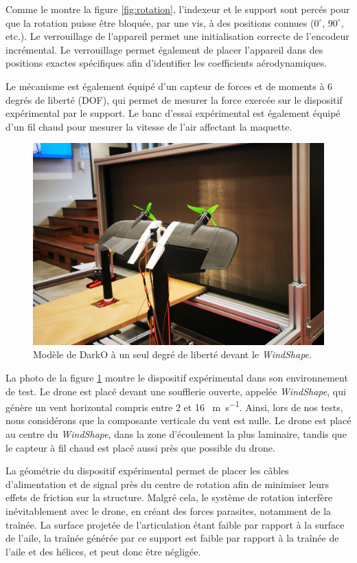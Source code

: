 Comme le montre la figure \ref{fig:rotation}, l'indexeur et le support sont percés pour que la rotation puisse être bloquée, par une vis, à des positions connues ($0^\circ$, $90^\circ$, etc.). Le verrouillage de l'appareil permet une initialisation correcte de l'encodeur incrémental. Le verrouillage permet également de placer l'appareil dans des positions exactes spécifiques afin d'identifier les coefficients aérodynamiques. 

Le mécanisme est également équipé d'un capteur de forces et de moments à 6 degrés de liberté (DOF), qui permet de mesurer la force exercée sur le dispositif expérimental par le support. Le banc d'essai expérimental est également équipé d'un fil chaud pour mesurer la vitesse de l'air affectant la maquette. 

\begin{figure}[!ht]
    \centering
    \includegraphics[trim=0cm 5cm 0cm 6cm,clip,width=0.8\columnwidth]{figures/real_test_bench-min.jpg}
    \caption{Modèle de DarkO à un seul degré de liberté devant le \textit{WindShape}.}
    \label{fig:real_test_bench}
\end{figure}
La photo de la figure \ref{fig:real_test_bench} montre le dispositif expérimental dans son environnement de test. Le drone est placé devant une soufflerie ouverte, appelée \textit{WindShape}, qui génère un vent horizontal compris entre 2 et 16 \SI{}{\meter\per\second}. Ainsi, lors de nos tests, nous considérons que la composante verticale du vent est nulle. Le drone est placé au centre du \textit{WindShape}, dans la zone d'écoulement la plus laminaire, tandis que le capteur à fil chaud est placé aussi près que possible du drone. 

La géométrie du dispositif expérimental permet de placer les câbles d'alimentation et de signal près du centre de rotation afin de minimiser leurs effets de friction sur la structure. Malgré cela, le système de rotation interfère inévitablement avec le drone, en créant des forces parasites, notamment de la traînée. La surface projetée de l'articulation étant faible par rapport à la surface de l'aile, la traînée générée par ce support est faible par rapport à la traînée de l'aile et des hélices, et peut donc être négligée.

